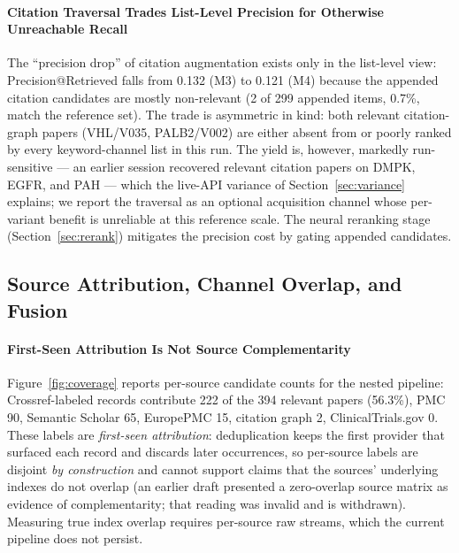 \documentclass[nonacm,sigconf]{acmart}
\begin{document}
\paragraph{Citation Traversal Trades List-Level Precision for Otherwise Unreachable Recall}
The ``precision drop'' of citation augmentation exists only in the
list-level view: Precision@Retrieved falls from 0.132 (M3) to 0.121 (M4)
because the appended citation candidates are mostly non-relevant (2 of 299
appended items, 0.7\%, match the reference set). The trade is asymmetric
in kind: both relevant citation-graph papers (VHL/V035, PALB2/V002) are
either absent from or poorly ranked by every keyword-channel list in this
run. The yield is, however, markedly run-sensitive --- an earlier session
recovered relevant citation papers on DMPK, EGFR, and PAH --- which the
live-API variance of Section~\ref{sec:variance} explains; we report the
traversal as an optional acquisition channel whose per-variant benefit is
unreliable at this reference scale. The neural reranking stage
(Section~\ref{sec:rerank}) mitigates the precision cost by gating appended
candidates.

\subsection{Source Attribution, Channel Overlap, and Fusion}
\label{sec:coverage}

\paragraph{First-Seen Attribution Is Not Source Complementarity}
Figure~\ref{fig:coverage} reports per-source candidate counts for the
nested pipeline: Crossref-labeled records contribute 222 of the 394
relevant papers (56.3\%), PMC 90, Semantic Scholar 65, EuropePMC 15,
citation graph 2, ClinicalTrials.gov 0. These
labels are \emph{first-seen attribution}: deduplication keeps the first
provider that surfaced each record and discards later occurrences, so
per-source labels are disjoint \emph{by construction} and cannot support
claims that the sources' underlying indexes do not overlap (an earlier
draft presented a zero-overlap source matrix as evidence of
complementarity; that reading was invalid and is withdrawn). Measuring
true index overlap requires per-source raw streams, which the current
pipeline does not persist.
\end{document}
